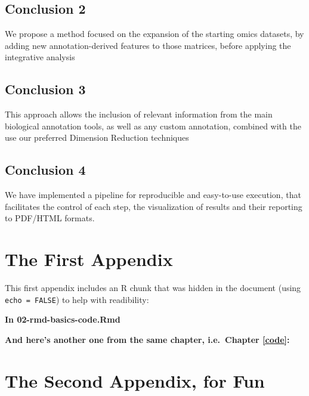 \documentclass[a4paper, nobind]{templates/ociamthesis}
\begin{document}
\hypertarget{conclusion-2}{%
\section*{Conclusion 2}\label{conclusion-2}}

We propose a method focused on the expansion of the starting omics datasets, by adding new annotation-derived features to those matrices, before applying the integrative analysis

\hypertarget{conclusion-3}{%
\section*{Conclusion 3}\label{conclusion-3}}

This approach allows the inclusion of relevant information from the main biological annotation tools, as well as any custom annotation, combined with the use our preferred Dimension Reduction techniques

\hypertarget{conclusion-4}{%
\section*{Conclusion 4}\label{conclusion-4}}

We have implemented a pipeline for reproducible and easy-to-use execution, that facilitates the control of each step, the visualization of results and their reporting to PDF/HTML formats.

\startappendices

\hypertarget{the-first-appendix}{%
\chapter{The First Appendix}\label{the-first-appendix}}

This first appendix includes an R chunk that was hidden in the document (using \texttt{echo\ =\ FALSE}) to help with readibility:

\textbf{In 02-rmd-basics-code.Rmd}

\textbf{And here's another one from the same chapter, i.e.~Chapter \ref{code}:}

\hypertarget{the-second-appendix-for-fun}{%
\chapter{The Second Appendix, for Fun}\label{the-second-appendix-for-fun}}
\end{document}
